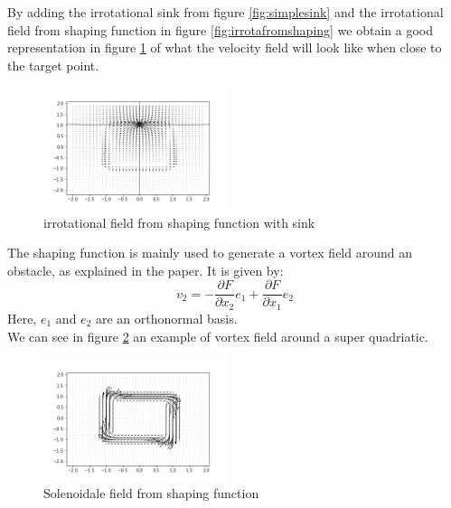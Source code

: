 By adding the irrotational sink from figure \ref{fig:simplesink} and the irrotational field from shaping function in figure \ref{fig:irrotafromshaping} we obtain a good representation in figure \ref{fig:irrotafromshapingwithsink} of what the velocity field will look like when close to the target point. 
\begin{figure}[h!]
    \centering
    \includegraphics[width=0.48\textwidth]{Images/irrotashapingwithsink.png}
    \caption{irrotational field from shaping function with sink}
    \label{fig:irrotafromshapingwithsink}
\end{figure}

The shaping function is mainly used to generate a vortex field around an obstacle, as explained in the paper. It is given by: 
\begin{equation}
    v_2=-\frac{\partial{F}}{\partial{x_2}}e_1 + \frac{\partial{F}}{\partial{x_1}}e_2
\end{equation}
Here, $e_1$ and $e_2$ are an orthonormal basis. \\ 
We can see in figure \ref{fig:rotafromshaping} an example of vortex field around a super quadriatic.
\begin{figure}[h!]
    \centering
    \includegraphics[width=0.48\textwidth]{Images/rotafromshaping.png}
    \caption{Solenoidale field from shaping function}
    \label{fig:rotafromshaping}
\end{figure}

